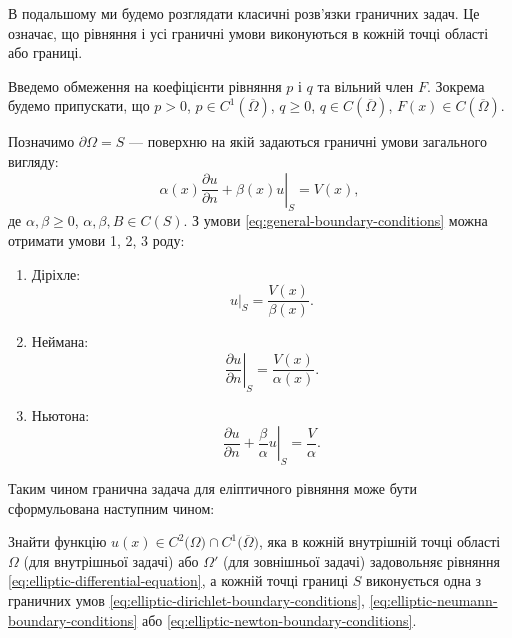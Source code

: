 \begin{remark}
    В подальшому ми будемо розглядати класичні розв'язки граничних задач. Це означає, що рівняння і усі граничні умови виконуються в кожній точці області або границі.
\end{remark}

Введемо обмеження на коефіцієнти рівняння $p$ і $q$ та вільний член $F$. Зокрема будемо припускати, що $p > 0$, $p \in C^1 \left(\overline \Omega\right)$, $q \ge 0$, $q \in C \left(\overline \Omega\right)$, $F(x) \in C \left(\overline \Omega\right)$. \medskip

Позначимо $\partial \Omega = S$ --- поверхню на якій задаються граничні умови загального
вигляду:
\begin{equation}
    \label{eq:general-boundary-conditions}
    \left. \alpha(x) \frac{\partial u}{\partial n} + \beta(x) u \right|_S = V(x),
\end{equation}
де $\alpha, \beta \ge 0$, $\alpha, \beta, B \in C(S)$. З умови \eqref{eq:general-boundary-conditions} можна отримати умови 1, 2, 3 роду:
\begin{enumerate}
    \item Діріхле:
    \begin{equation}
        \label{eq:elliptic-dirichlet-boundary-conditions}
        \left. u \right|_S = \frac{V(x)}{\beta(x)}.
    \end{equation}
    \item Неймана:
    \begin{equation}
        \label{eq:elliptic-neumann-boundary-conditions}
        \left. \frac{\partial u}{\partial n} \right|_S = \frac{V(x)}{\alpha(x)}.
    \end{equation}
    \item Ньютона:
    \begin{equation}
        \label{eq:elliptic-newton-boundary-conditions}
        \left. \frac{\partial u}{\partial n} + \frac{\beta}{\alpha} u \right|_S = \frac{V}{\alpha}.
    \end{equation}
\end{enumerate}

Таким чином гранична задача для еліптичного рівняння може бути сформульована наступним чином: 
\begin{problem_formulation*}
    Знайти функцію $u(x) \in C^2\big(\Omega\big) \cap C^1 \big( \overline \Omega \big)$, яка в кожній внутрішній точці області $\Omega$ (для внутрішньої задачі) або $\Omega'$ (для зовнішньої задачі) задовольняє рівняння \eqref{eq:elliptic-differential-equation}, а кожній точці границі $S$ виконується одна з граничних умов \eqref{eq:elliptic-dirichlet-boundary-conditions}, \eqref{eq:elliptic-neumann-boundary-conditions} або \eqref{eq:elliptic-newton-boundary-conditions}.
\end{problem_formulation*}

